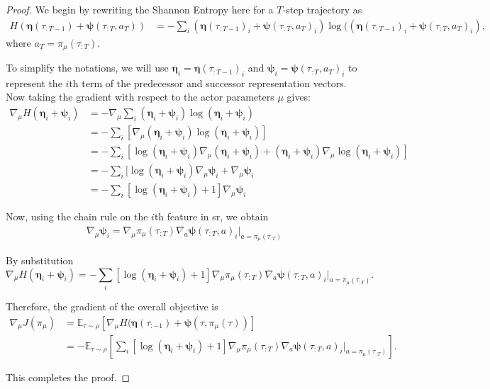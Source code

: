 \documentclass{article}
\theoremstyle{plain}
\theoremstyle{definition}
\theoremstyle{remark}
\begin{document}
\begin{proof}

We begin by rewriting the Shannon Entropy here for a $T$-step trajectory as 
\begin{align}
    H(\pmb{\eta}(\tau_{:T-1}) + \pmb{\psi} (\tau_{:T}, a_T)) &= -\sum_i (\pmb{\eta}(\tau_{:T-1})_i + \pmb{\psi} (\tau_{:T}, a_T)_i) \log ((\pmb{\eta}(\tau_{:T-1})_i + \pmb{\psi} (\tau_{:T}, a_T)_i),
\end{align}
where $a_T = \pi_\mu(\tau_{:T})$.

To simplify the notations, we will use $\pmb{\eta}_i=\pmb{\eta}(\tau_{:T-1})_i$ and $\pmb{\psi}_i=\pmb{\psi} (\tau_{:T}, a_T)_i$ to represent the $i$th term of the predecessor and successor representation vectors.
Now taking the gradient with respect to the actor parameters $\mu$ gives:
\begin{align}
    \nabla_{\mu} H(\pmb{\eta}_i + \pmb{\psi}_i) &= -\nabla_{\mu} \sum_i (\pmb{\eta}_i + \pmb{\psi}_i) \log (\pmb{\eta}_i + \pmb{\psi}_i) \\
    &= -\sum_i [\nabla_{\mu} (\pmb{\eta}_i + \pmb{\psi}_i) \log(\pmb{\eta}_i + \pmb{\psi}_i)] \\
    &= -\sum_i [\log(\pmb{\eta}_i + \pmb{\psi}_i) \nabla_{\mu} (\pmb{\eta}_i + \pmb{\psi}_i) +  (\pmb{\eta}_i + \pmb{\psi}_i) \nabla_{\mu} \log(\pmb{\eta}_i + \pmb{\psi}_i)] \\
    &= -\sum_i [\log(\pmb{\eta}_i + \pmb{\psi}_i) \nabla_{\mu} \pmb{\psi}_i +
     \nabla_{\mu} \pmb{\psi}_i \\
     &= -\sum_i [\log(\pmb{\eta}_i + \pmb{\psi}_i) + 1] \nabla_{\mu} \pmb{\psi}_i 
\end{align}

Now, using the chain rule on the $i$th feature in \gls{sr}, we obtain 
\begin{align}
    \nabla_{\mu} \pmb{\psi}_i = \nabla_{\mu} \pi_{\mu}(\tau_{:T}) \nabla_a \pmb{\psi}(\tau_{:T},a)_i |_{a=\pi_{\mu}(\tau_{:T})} 
\end{align}

By substitution
\begin{equation}
    \nabla_{\mu} H(\pmb{\eta}_i + \pmb{\psi}_i) = -\sum_i [\log(\pmb{\eta}_i + \pmb{\psi}_i) + 1] \nabla_{\mu} \pi_{\mu}(\tau_{:T}) \nabla_a \pmb{\psi}(\tau_{:T},a)_i |_{a=\pi_{\mu}(\tau_{:T})}.
\end{equation}

Therefore, the gradient of the overall objective is
\begin{align}
    \nabla_{\mu}J(\pi_{\mu}) &= \mathbb{E}_{\tau\sim\rho} [ \nabla_{\mu} H(\pmb{\eta}(\tau_{:-1}) + \pmb{\psi} (\tau, \pi_{\mu}(\tau))] \\
    &= - \mathbb{E}_{\tau\sim\rho} \left[\sum_i [\log(\pmb{\eta}_i + \pmb{\psi}_i) + 1] \nabla_{\mu} \pi_{\mu}(\tau_{:T}) \nabla_a \pmb{\psi}(\tau_{:T},a)_i |_{a=\pi_{\mu}(\tau_{:T})} \right].
\end{align}

This completes the proof.
\end{proof}
\end{document}
